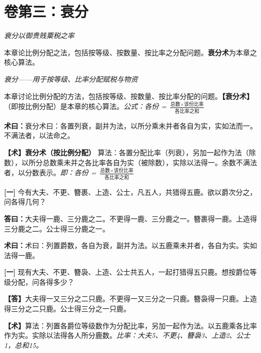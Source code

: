 \documentclass[10pt,a4paper]{article}
\newlength{\lw}
\newlength{\rw}
\newcommand{\biling}[2]{%
  \par\vspace{0.2em}%
  \noindent%
  \colorbox{classicalbg}{\parbox{\dimexpr\lw-2\fboxsep\relax}{#1}}%
  \hfill%
  \colorbox{modernbg}{\parbox{\dimexpr\rw-2\fboxsep\relax}{#2}}%
  \vspace{0.2em}%
}
\newcommand{\bilingc}[2]{%
  \par\vspace{0.1em}%
  \noindent\begin{minipage}[t]{\lw}
  {\small #1}
  \end{minipage}%
  \hfill%
  \begin{minipage}[t]{\rw}
  {\small #2}
  \end{minipage}%
  \vspace{0.1em}%
}
\newcommand{\da}{\textbf{\textcolor{answercolor}{答曰：}}}
\newcommand{\daB}{\textbf{\textcolor{answercolor}{【答】}}}
\newcommand{\shu}{\textbf{\textcolor{methodcolor}{术曰：}}}
\newcommand{\shuB}{\textbf{\textcolor{methodcolor}{【术】}}}
\newcommand{\pn}[1]{\textbf{[#1]}}
\newcommand{\sk}{\vspace{0.1em}}
\begin{document}
\newpage


\section{卷第三：衰分}
\label{sec:cuifen}

\biling{
\begin{center}\textit{衰分以御贵贱粟税之率}\end{center}

本章论比例分配之法，包括按等级、按数量、按比率之分配问题。\textbf{衰分术}为本章之核心算法。
}{
\begin{center}\textit{衰分——用于按等级、比率分配赋税与物资}\end{center}

本章讨论比例分配的方法，包括按等级、按数量、按比率分配的问题。\textbf{【衰分术】}（即按比例分配）是本章的核心算法。\textit{公式：各份 = $\frac{\text{总数}\times\text{该份比率}}{\text{各比率之和}}$}
}

\sk

\bilingc{
\shu 衰分术曰：各置列衰，副并为法，以所分乘未并者各自为实，实如法而一。不满法者，以法命之。
}{
\shuB \textbf{衰分术（按比例分配）} 算法：各置分配比率（列衰），另加一起作为法（除数），以所分总数乘未并之各比率各自为实（被除数），实除以法得一。余数不满法者，以分数表示。\textit{即：各份 = $\frac{\text{总数}\times\text{该份比率}}{\text{各比率之和}}$}
}

\bigskip

\bilingc{
\pn{一} 今有大夫、不更、簪裹、上造、公士，凡五人，共猎得五鹿。欲以爵次分之，问各得几何？

\da 大夫得一鹿、三分鹿之二。不更得一鹿、三分鹿之一。簪裹得一鹿。上造得三分鹿之二。公士得三分鹿之一。

\shu 术曰：列置爵数，各自为衰，副并为法。以五鹿乘未并者，各自为实。实如法得一鹿。
}{
\pn{一} 现有大夫、不更、簪袅、上造、公士共五人，一起打猎得五只鹿。想按爵位等级分配，问各得多少？

\daB 大夫得一又三分之二只鹿。不更得一又三分之一只鹿。簪袅得一只鹿。上造得三分之二只鹿。公士得三分之一只鹿。

\shuB 算法：列置各爵位等级数作为分配比率，另加一起作为法。以五鹿乘各比率作为实。实除以法得各人所分鹿数。\textit{比率：大夫5、不更4、簪袅3、上造2、公士1，总和15。}
}

\vspace{0.3em}
\end{document}
